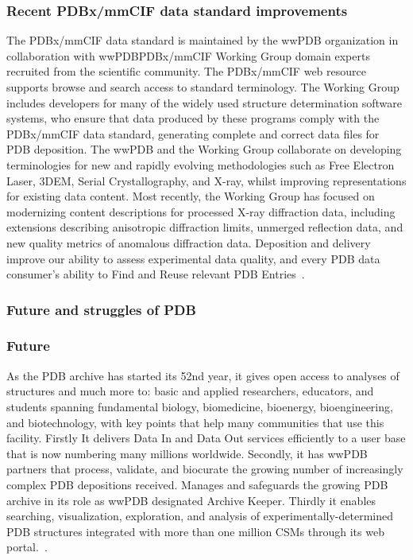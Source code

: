 \documentclass[]{final_report}
\begin{document}
\subsubsection{Recent PDBx/mmCIF data standard improvements}

The PDBx/mmCIF data standard is maintained by the wwPDB organization in collaboration with wwPDBPDBx/mmCIF Working Group domain experts recruited from the scientific community. The PDBx/mmCIF web resource supports browse and search access to standard terminology. The Working Group includes developers for many of the widely used structure determination software systems, who ensure that data produced by these programs comply with the PDBx/mmCIF data standard, generating complete and correct data files for PDB deposition. The wwPDB and the Working Group collaborate on developing terminologies for new and rapidly evolving methodologies such as Free Electron Laser, 3DEM, Serial Crystallography, and X-ray, whilst improving representations for existing data content. Most recently, the Working Group has focused on modernizing content descriptions for processed X-ray diffraction data, including extensions describing anisotropic diffraction limits, unmerged reflection data, and new quality metrics of anomalous diffraction data. Deposition and delivery improve our ability to assess experimental data quality, and every PDB data consumer's ability to Find and Reuse relevant PDB Entries~\cite{burley_rcsb_2022}.

\clearpage

\subsubsection{Future and struggles of PDB}
\subsubsection{Future}
As the PDB archive has started its 52nd year, it gives open access to analyses of structures and much more to: basic and applied researchers, educators, and students spanning fundamental biology, biomedicine, bioenergy, bioengineering, and biotechnology, with key points that help many communities that use this facility. Firstly It delivers Data In and Data Out services efficiently to a user base that is now numbering many millions worldwide. Secondly, it has wwPDB partners that process, validate, and biocurate the growing number of increasingly complex PDB depositions received. Manages and safeguards the growing PDB archive in its role as wwPDB designated Archive Keeper. Thirdly it enables searching, visualization, exploration, and analysis of experimentally-determined PDB structures integrated with more than one million CSMs through its web portal.~\cite{burley1_rcsb_2022}.
\end{document}

